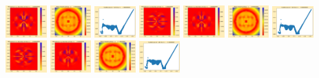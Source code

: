 \documentclass[11pt]{article}
\begin{document}
\includegraphics[width=0.11875\textwidth]{frame0018fig3.png}
\includegraphics[width=0.11875\textwidth]{frame0019fig0.png}
\includegraphics[width=0.11875\textwidth]{frame0019fig1.png}
\includegraphics[width=0.11875\textwidth]{frame0019fig2.png}
\includegraphics[width=0.11875\textwidth]{frame0019fig3.png}
\vskip 10pt 
\includegraphics[width=0.11875\textwidth]{frame0020fig0.png}
\includegraphics[width=0.11875\textwidth]{frame0020fig1.png}
\includegraphics[width=0.11875\textwidth]{frame0020fig2.png}
\includegraphics[width=0.11875\textwidth]{frame0020fig3.png}
\includegraphics[width=0.11875\textwidth]{frame0021fig0.png}
\includegraphics[width=0.11875\textwidth]{frame0021fig1.png}
\end{document}
